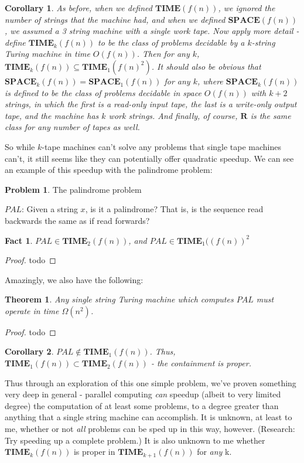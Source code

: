 \documentclass{article}
\theoremstyle{definition}
\newtheorem{problem}{Problem}
\theoremstyle{plain}
\theoremstyle{theorem}
\newtheorem{fact}{Fact}[section]
\newtheorem{theorem}{Theorem}[section]
\newtheorem{corollary}{Corollary}[section]
\begin{document}
\begin{corollary}
	As before, when we defined $\bm{TIME}(f(n))$, we ignored the number of strings that the machine had, and when we defined $\bm{SPACE}(f(n))$, we assumed a 3 string machine with a single work tape. Now apply more detail - define $\bm{TIME}_k(f(n))$ to be the class of problems decidable by a $k$-string Turing machine in time $O(f(n))$. Then for any $k$, $\bm{TIME}_k(f(n)) \subseteq \bm{TIME}_1(f(n)^2)$. It should also be obvious that $\bm{SPACE}_k(f(n)) = \bm{SPACE}_1(f(n))$ for any $k$, where $\bm{SPACE}_k(f(n))$ is defined to be the class of problems decidable in space $O(f(n))$ with $k+2$ strings, in which the first is a read-only input tape, the last is a write-only output tape, and the machine has $k$ work strings. And finally, of course, $\bm{R}$ is the same class for any number of tapes as well.
\end{corollary}
So while $k$-tape machines can't solve any problems that single tape machines can't, it still seems like they can potentially offer quadratic speedup. We can see an example of this speedup with the palindrome problem:
\begin{problem}
	The palindrome problem
	\begin{center}
		$PAL$: Given a string $x$, is it a palindrome? That is, is the sequence read backwards the same as if read forwards?
	\end{center}
\end{problem}
\begin{fact}
	$PAL \in \bm{TIME}_2(f(n))$, and $PAL \in \bm{TIME}_1((f(n))^2$
\end{fact}
\begin{proof}
	todo
\end{proof}
Amazingly, we also have the following:
\begin{theorem}
	\textit{Any} single string Turing machine which computes $PAL$ must operate in time $\Omega(n^2)$. 
\end{theorem}
\begin{proof}
	todo
\end{proof}
\begin{corollary}
	$PAL \notin \bm{TIME}_1(f(n))$. Thus, $\bm{TIME}_1(f(n)) \subset \bm{TIME}_2(f(n))$ - the containment is proper.
\end{corollary}
Thus through an exploration of this one simple problem, we've proven something very deep in general - parallel computing \textit{can} speedup (albeit to very limited degree) the computation of at least some problems, to a degree greater than anything that a single string machine can accomplish. It is unknown, at least to me, whether or not \textit{all} problems can be sped up in this way, however. (Research: Try speeding up a complete problem.) It is also unknown to me whether $\bm{TIME}_k(f(n))$ is proper in $\bm{TIME}_{k+1}(f(n))$ for \textit{any} k. \par
\end{document}
